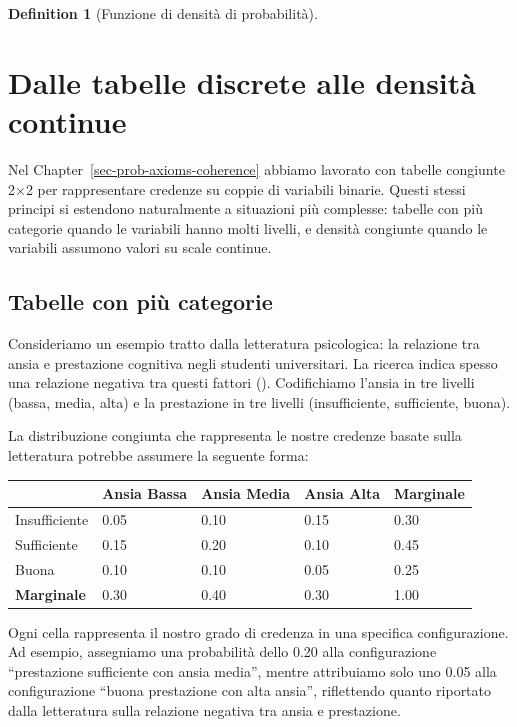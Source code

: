 \documentclass[
  letterpaper,
  DIV=11,
  numbers=noendperiod,
  oneside]{scrreprt}
\theoremstyle{definition}
\theoremstyle{plain}
\theoremstyle{definition}
\newtheorem{definition}{Definition}[chapter]
\theoremstyle{remark}
\begin{document}
\begin{definition}[Funzione di densità di
probabilità]
\begin{tcolorbox}
\end{tcolorbox}

\section{Dalle tabelle discrete alle densità
continue}\label{dalle-tabelle-discrete-alle-densituxe0-continue}

Nel Chapter~\ref{sec-prob-axioms-coherence} abbiamo lavorato con tabelle
congiunte 2×2 per rappresentare credenze su coppie di variabili binarie.
Questi stessi principi si estendono naturalmente a situazioni più
complesse: tabelle con più categorie quando le variabili hanno molti
livelli, e densità congiunte quando le variabili assumono valori su
scale continue.

\subsection{Tabelle con più
categorie}\label{tabelle-con-piuxf9-categorie}

Consideriamo un esempio tratto dalla letteratura psicologica: la
relazione tra ansia e prestazione cognitiva negli studenti universitari.
La ricerca indica spesso una relazione negativa tra questi fattori
(). Codifichiamo
l'ansia in tre livelli (bassa, media, alta) e la prestazione in tre
livelli (insufficiente, sufficiente, buona).

La distribuzione congiunta che rappresenta le nostre credenze basate
sulla letteratura potrebbe assumere la seguente forma:

\begin{longtable}[]{@{}lllll@{}}
\toprule\noalign{}
& Ansia Bassa & Ansia Media & Ansia Alta & Marginale \\
\midrule\noalign{}
\endhead
\bottomrule\noalign{}
\endlastfoot
Insufficiente & 0.05 & 0.10 & 0.15 & 0.30 \\
Sufficiente & 0.15 & 0.20 & 0.10 & 0.45 \\
Buona & 0.10 & 0.10 & 0.05 & 0.25 \\
\textbf{Marginale} & 0.30 & 0.40 & 0.30 & 1.00 \\
\end{longtable}

Ogni cella rappresenta il nostro grado di credenza in una specifica
configurazione. Ad esempio, assegniamo una probabilità dello 0.20 alla
configurazione ``prestazione sufficiente con ansia media'', mentre
attribuiamo solo uno 0.05 alla configurazione ``buona prestazione con
alta ansia'', riflettendo quanto riportato dalla letteratura sulla
relazione negativa tra ansia e prestazione.


\end{definition}
\end{document}
